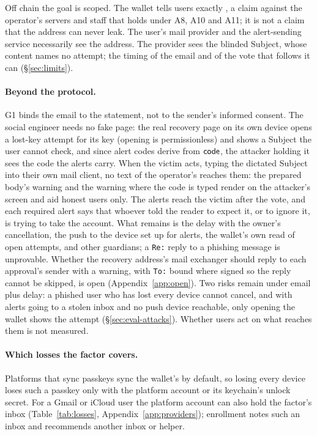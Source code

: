 Off chain the goal is scoped. The wallet tells users exactly
\PrivacyClaim, a claim against the operator's servers and staff that holds
under A8, A10 and A11; it is not a claim that the address can never
leak. The user's mail provider and the
alert-sending service necessarily see the address. The provider sees the
blinded Subject, whose content names no attempt; the timing of the email
and of the vote that follows it can (\S\ref{sec:limits}).

\paragraph{Beyond the protocol.} G1 binds the email to the statement, not to
the sender's informed consent. The social engineer needs no fake page: the
real recovery page on its own device opens a lost-key attempt for its key
(opening is permissionless) and shows a Subject the user cannot check, and
since alert codes derive from $\mathsf{code}$, the attacker holding it sees the code
the alerts carry. When the victim acts, typing the dictated Subject into
their own mail client, no text of the operator's reaches them: the prepared
body's warning and the warning where the code is typed render on the
attacker's screen and aid honest users only. The alerts reach the victim
after the vote, and each required alert says that whoever told the reader to
expect it, or to ignore it, is trying to take the
account. What remains is the delay with the owner's
cancellation, the push to the device set up for alerts, the wallet's own read
of open attempts, and other guardians; a \texttt{Re:} reply to a phishing
message is unprovable. Whether the recovery address's mail exchanger should
reply to each approval's sender with a warning, with \texttt{To:} bound
where signed so the reply cannot be skipped, is open
(Appendix~\ref{app:open}). Two risks remain under email plus
delay: a phished user who has lost every device cannot cancel, and with
alerts going to a stolen inbox and no push device reachable, only opening the
wallet shows the attempt (\S\ref{sec:eval-attacks}). Whether users act on
what reaches them is not measured.

\paragraph{Which losses the factor covers.} Platforms that sync passkeys
sync the wallet's by default, so losing every device loses such a passkey
only with the platform account or its keychain's unlock
secret. For a Gmail or iCloud user the platform account
can also hold the factor's inbox (Table~\ref{tab:losses},
Appendix~\ref{app:providers}); enrollment notes
such an inbox and recommends another inbox or
helper.


